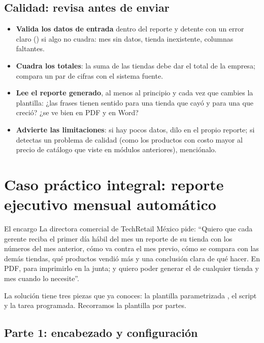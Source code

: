 \subsection{Calidad: revisa antes de enviar}

\begin{itemize}
  \item \textbf{Valida los datos de entrada} dentro del reporte y detente con
        un error claro () si algo no cuadra: mes sin datos,
        tienda inexistente, columnas faltantes.
  \item \textbf{Cuadra los totales}: la suma de las tiendas debe dar el total
        de la empresa; compara un par de cifras con el sistema fuente.
  \item \textbf{Lee el reporte generado}, al menos al principio y cada vez
        que cambies la plantilla: ¿las frases tienen sentido para una tienda
        que cayó y para una que creció? ¿se ve bien en PDF y en Word?
  \item \textbf{Advierte las limitaciones}: si hay pocos datos, dilo en el
        propio reporte; si detectas un problema de calidad (como los
        productos con costo mayor al precio de catálogo que viste en módulos
        anteriores), menciónalo.
\end{itemize}

\section{Caso práctico integral: reporte ejecutivo mensual automático}
\label{sec:m8-caso}

\begin{negocio}{El encargo}
La directora comercial de TechRetail México pide: ``Quiero que cada gerente
reciba el primer día hábil del mes un reporte de su tienda con los números
del mes anterior, cómo va contra el mes previo, cómo se compara con las
demás tiendas, qué productos vendió más y una conclusión clara de qué hacer.
En PDF, para imprimirlo en la junta; y quiero poder generar el de cualquier
tienda y mes cuando lo necesite''.
\end{negocio}

La solución tiene tres piezas que ya conoces: la plantilla parametrizada
, el script 
y la tarea programada. Recorramos la plantilla por partes.

\subsection{Parte 1: encabezado y configuración}


